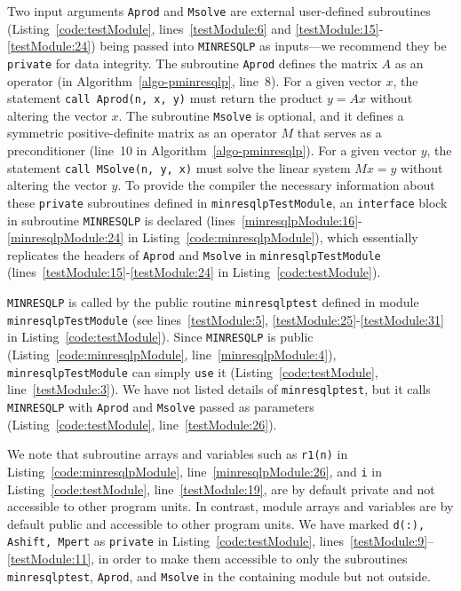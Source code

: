 \documentclass{doc_acmtrans2m}
\begin{document}
Two input arguments \texttt{Aprod} and \texttt{Msolve} are external
user-defined subroutines (Listing~\ref{code:testModule},
lines~\ref{testModule:6} and \ref{testModule:15}-\ref{testModule:24})
being passed into \texttt{MINRESQLP} as inputs---we recommend they be
\texttt{private} for data integrity. The subroutine \texttt{Aprod}
defines the matrix $A$ as an operator (in
Algorithm~\ref{algo-pminresqlp}, line~8). For a given vector $x$, the
\FORTRAN statement \texttt{call Aprod(n, x, y)} must return the
product $y=Ax$ without altering the vector $x$. The subroutine
\texttt{Msolve} is optional, and it defines a symmetric
positive-definite matrix as an operator $M$ that serves as a
preconditioner (line~10 in Algorithm~\ref{algo-pminresqlp}).  For a
given vector $y$, the \FORTRAN statement \texttt{call MSolve(n, y, x)}
must solve the linear system $Mx=y$ without altering the vector $y$.
To provide the compiler the necessary information about these
\texttt{private} subroutines defined in \texttt{minresqlpTestModule},
an \texttt{interface} block in subroutine \texttt{MINRESQLP} is
declared (lines~\ref{minresqlpModule:16}-\ref{minresqlpModule:24} in
Listing~\ref{code:minresqlpModule}), which essentially replicates the
headers of \texttt{Aprod} and \texttt{Msolve} in
\texttt{minresqlpTestModule}
(lines~\ref{testModule:15}-\ref{testModule:24} in
Listing~\ref{code:testModule}).

\texttt{MINRESQLP} is called by the public routine
\texttt{minresqlptest} defined in module \texttt{minresqlpTestModule}
(see lines~\ref{testModule:5}, \ref{testModule:25}-\ref{testModule:31}
in Listing~\ref{code:testModule}).  Since \texttt{MINRESQLP} is public
(Listing~\ref{code:minresqlpModule}, line~\ref{minresqlpModule:4}),
\texttt{minresqlpTestModule} can simply \texttt{use} it
(Listing~\ref{code:testModule}, line~\ref{testModule:3}).  We have not
listed details of \texttt{minresqlptest}, but it calls
\texttt{MINRESQLP} with \texttt{Aprod} and \texttt{Msolve} passed as
parameters (Listing~\ref{code:testModule}, line~\ref{testModule:26}).

We note that subroutine arrays and variables such as \texttt{r1(n)} in
Listing~\ref{code:minresqlpModule}, line~\ref{minresqlpModule:26}, and
\texttt{i} in Listing~\ref{code:testModule}, line~\ref{testModule:19},
are by default private and not accessible to other program units.  In
contrast, module arrays and variables are by default public and
accessible to other program units. We have marked \texttt{d(:),
  Ashift, Mpert} as \texttt{private} in Listing~\ref{code:testModule},
lines~\ref{testModule:9}--\ref{testModule:11}, in order to make them
accessible to only the subroutines \texttt{minresqlptest},
\texttt{Aprod}, and \texttt{Msolve} in the containing module but not
outside.
\end{document}
